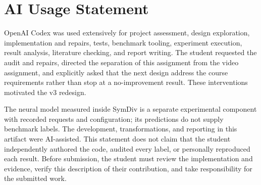 \documentclass[sigconf]{acmart}
\begin{document}
\section*{AI Usage Statement}
OpenAI Codex was used extensively for project assessment, design exploration,
implementation and repairs, tests, benchmark tooling, experiment execution,
result analysis, literature checking, and report writing. The student
requested the audit and repairs, directed the separation of this assignment
from the video assignment, and explicitly asked that the next design
address the course requirements rather than stop at a no-improvement result.
These interventions motivated the v3 redesign.

The neural model measured inside SymDiv is a separate experimental component
with recorded requests and configuration; its predictions do not supply
benchmark labels. The development, transformations, and reporting in this
artifact were AI-assisted. This statement does not claim that the student
independently authored the code, audited every label, or personally
reproduced each result. Before submission, the student must review the
implementation and evidence, verify this description of their contribution,
and take responsibility for the submitted work.

\clearpage


\end{document}
